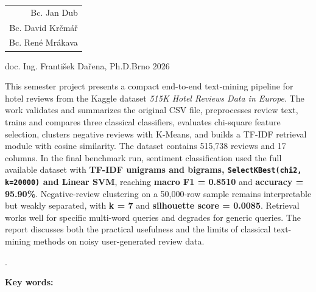 \documentclass[twoside, 12pt]{article}
\begin{document}
\makeatletter
\def\typprace{Semester}
\def\c@prace{project}
\def\a@prace{project}
\renewcommand{\contentsname}{Contents}
\renewcommand{\refname}{References}
\def\obsah{\cleardoublepage\vspace*{5mm}%
  \noindent {\doplsanserif\bfseries Abstract}\par\medskip
  \noindent \@enabstraktdata\par\medskip\noindent\@enabstrakttext
  \if .\@enklslova\else \par\medskip\noindent
       {\doplsanserif\bfseries Key words:} \@enklslova
  \fi
  \cleardoublepage\tableofcontents\cleardoublepage}
\makeatother
{}
{\begin{tabular}[b]{@{}r} Bc. Jan Dub \\ Bc. David Krčmář \\ Bc. René Mrákava \end{tabular}}{doc. Ing. František Dařena, Ph.D.}{Brno 2026}

{This semester project presents a compact end-to-end text-mining pipeline for hotel reviews from the Kaggle dataset \emph{515K Hotel Reviews Data in Europe}. The work validates and summarizes the original CSV file, preprocesses review text, trains and compares three classical classifiers, evaluates chi-square feature selection, clusters negative reviews with K-Means, and builds a TF-IDF retrieval module with cosine similarity. The dataset contains 515,738 reviews and 17 columns. In the final benchmark run, sentiment classification used the full available dataset with \textbf{TF-IDF unigrams and bigrams, \texttt{SelectKBest(chi2, k=20000)} and Linear SVM}, reaching \textbf{macro F1 = 0.8510} and \textbf{accuracy = 95.90\%}. Negative-review clustering on a 50,000-row sample remains interpretable but weakly separated, with \textbf{k = 7} and \textbf{silhouette score = 0.0085}. Retrieval works well for specific multi-word queries and degrades for generic queries. The report discusses both the practical usefulness and the limits of classical text-mining methods on noisy user-generated review data.}


\obsah
\end{document}
